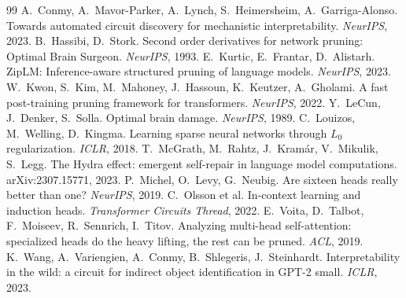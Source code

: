 \documentclass[11pt]{article}
\begin{document}
\begin{thebibliography}{99}\setlength{\itemsep}{2pt}\small
{} A.~Conmy, A.~Mavor-Parker, A.~Lynch, S.~Heimersheim, A.~Garriga-Alonso.
  Towards automated circuit discovery for mechanistic interpretability. \emph{NeurIPS}, 2023.
 B.~Hassibi, D.~Stork. Second order derivatives for network
  pruning: Optimal Brain Surgeon. \emph{NeurIPS}, 1993.
 E.~Kurtic, E.~Frantar, D.~Alistarh. ZipLM: Inference-aware
  structured pruning of language models. \emph{NeurIPS}, 2023.
 W.~Kwon, S.~Kim, M.~Mahoney, J.~Hassoun, K.~Keutzer, A.~Gholami.
  A fast post-training pruning framework for transformers. \emph{NeurIPS}, 2022.
 Y.~LeCun, J.~Denker, S.~Solla. Optimal brain damage. \emph{NeurIPS}, 1989.
 C.~Louizos, M.~Welling, D.~Kingma. Learning sparse neural
  networks through $L_0$ regularization. \emph{ICLR}, 2018.
 T.~McGrath, M.~Rahtz, J.~Kram\'ar, V.~Mikulik, S.~Legg.
  The Hydra effect: emergent self-repair in language model computations. arXiv:2307.15771, 2023.
 P.~Michel, O.~Levy, G.~Neubig. Are sixteen heads really better
  than one? \emph{NeurIPS}, 2019.
 C.~Olsson et al. In-context learning and induction heads.
  \emph{Transformer Circuits Thread}, 2022.
 E.~Voita, D.~Talbot, F.~Moiseev, R.~Sennrich, I.~Titov. Analyzing
  multi-head self-attention: specialized heads do the heavy lifting, the rest can be pruned. \emph{ACL}, 2019.
 K.~Wang, A.~Variengien, A.~Conmy, B.~Shlegeris, J.~Steinhardt.
  Interpretability in the wild: a circuit for indirect object identification in GPT-2 small. \emph{ICLR}, 2023.
\end{thebibliography}
\end{document}
